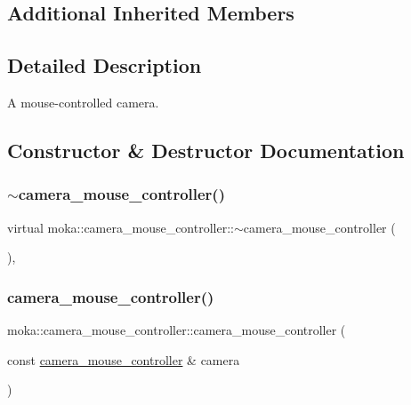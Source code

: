 \subsection*{Additional Inherited Members}


\subsection{Detailed Description}
A mouse-\/controlled camera. 

\subsection{Constructor \& Destructor Documentation}
\mbox{\label{classmoka_1_1camera__mouse__controller_ae40951c1866e72474b6ed7324e6db72f}} 
\subsubsection{\texorpdfstring{$\sim$camera\_mouse\_controller()}{~camera\_mouse\_controller()}}
{\footnotesize\ttfamily virtual moka\+::camera\+\_\+mouse\+\_\+controller\+::$\sim$camera\+\_\+mouse\+\_\+controller (\begin{DoxyParamCaption}{ }\end{DoxyParamCaption})\hspace{0.3cm}{\ttfamily [virtual]}, {\ttfamily [default]}}

\mbox{\label{classmoka_1_1camera__mouse__controller_aca731723969ae09a48d21f0c5814ba27}} 
\subsubsection{\texorpdfstring{camera\_mouse\_controller()}{camera\_mouse\_controller()}\hspace{0.1cm}{\footnotesize\ttfamily [1/3]}}
{\footnotesize\ttfamily moka\+::camera\+\_\+mouse\+\_\+controller\+::camera\+\_\+mouse\+\_\+controller (\begin{DoxyParamCaption}\item[{const \mbox{\hyperlink{classmoka_1_1camera__mouse__controller}{camera\+\_\+mouse\+\_\+controller}} \&}]{camera }\end{DoxyParamCaption})\hspace{0.3cm}{\ttfamily [delete]}}

